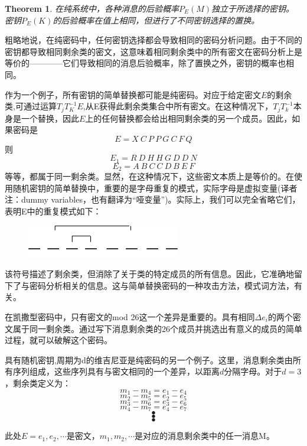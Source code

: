 \documentclass[]{article}
\newtheorem{theorem}{Theorem}
\begin{document}
\begin{theorem}
	在纯系统中，各种消息的后验概率$P_E(M)$独立于所选择的密钥。密钥$P_E(K)$的后验概率在值上相同，但进行了不同密钥选择的置换。
\end{theorem}

粗略地说，在纯密码中，任何密钥选择都会导致相同的密码分析问题。由于不同的密钥都导致相同剩余类的密文，这意味着相同剩余类中的所有密文在密码分析上是等价的————它们导致相同的消息后验概率，除了置换之外，密钥的概率也相同。

作为一个例子，所有密钥的简单替换都可能是纯密码。对应于给定密文$E$的剩余类,可通过运算$T_jT^{-1}_K E$,从E获得此剩余类集合中所有密文。在这种情况下，$T_jT^{-1}_k$本身是一个替换，因此$E$上的任何替换都会给出相同剩余类的另一个成员。因此，如果密码是
\[E=X\ C\ P\ P\ G\ C\ F\ Q\]
则
\[E_1=R\ D\ H\ H\ G\ D\ D\ N \]
\[E_2=A\ B\ C\ C\ D\ B\ E\ F \]
等等，都属于同一剩余类。显然，在这种情况下，这些密文本质上是等价的。在使用随机密钥的简单替换中，重要的是字母重复的模式，实际字母是虚拟变量(译者注：dummy variables，也有翻译为“哑变量”)。实际上，我们可以完全省略它们，表明E中的重复模式如下：

\begin{figure}[htbp]
	\centering
	\includegraphics[width=0.6\textwidth]{pattern.png}
\end{figure}

该符号描述了剩余类，但消除了关于类的特定成员的所有信息。因此，它准确地留下了与密码分析相关的信息。这与简单替换密码的一种攻击方法，模式词方法，有关。

在凯撒型密码中，只有密文的mod 26这一个差异是重要的。具有相同$\Delta e_i$的两个密文属于同一剩余类。通过写下消息剩余类的26个成员并挑选出有意义的成员的简单过程，就可以破解这个密码。

具有随机密钥,周期为d的维吉尼亚是纯密码的另一个例子。这里，消息剩余类由所有序列组成，这些序列具有与密文相同的一个差异，以距离$d$分隔字母。对于$d=3$，剩余类定义为：
\[m_1-m_4=e_1-e_4\]
\[m_2-m_5=e_2-e_5\]
\[m_3-m_6=e_3-e_6\]
\[m_4-m_7=e_4-e_7\]
\[\bullet\]
\[\bullet\]
\[\bullet\]

此处$E=e_1,e_2,\cdots$是密文，$m_1,m_2,\cdots$是对应的消息剩余类中的任一消息M。
\end{document}
